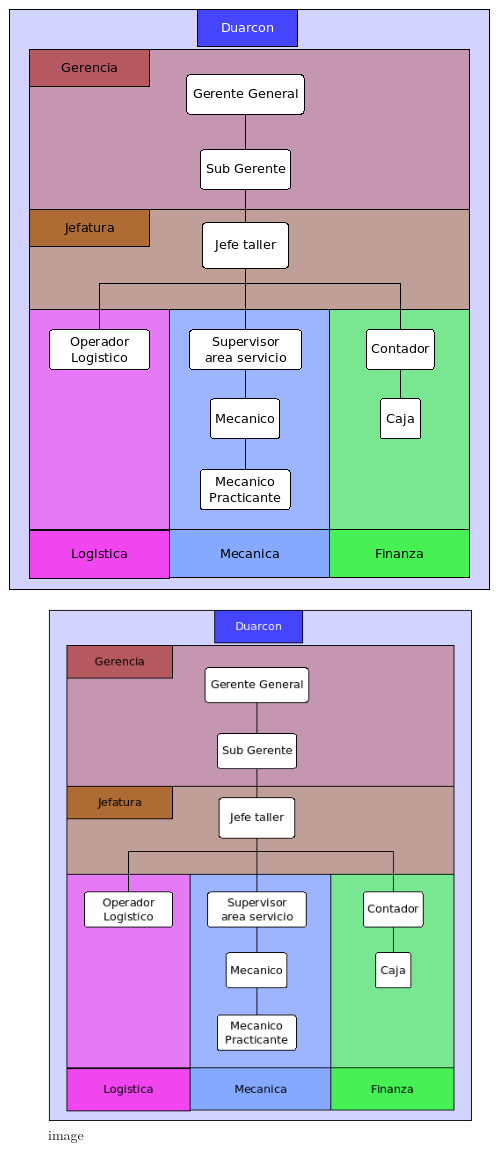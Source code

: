 \documentclass[11pt]{article}
\begin{document}
    \includegraphics{marco teorico/organigrama.png}

    \begin{figure}
\centering
\includegraphics{marco teorico/organigrama.png}
\caption{image}
\end{figure}
\end{document}
